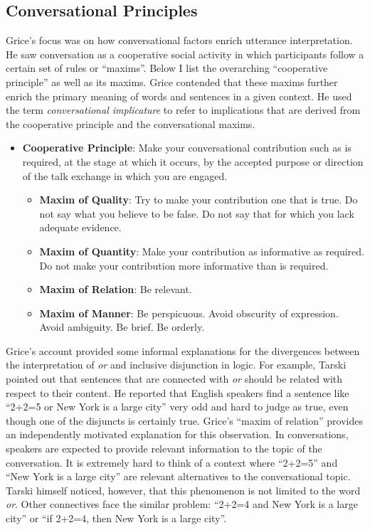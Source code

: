\documentclass[oneside]{report}
\theoremstyle{definition}
\theoremstyle{definition}
\theoremstyle{definition}
\theoremstyle{remark}
\begin{document}
\subsection{Conversational Principles}\label{conversational-principles}

Grice's focus was on how conversational factors enrich utterance
interpretation. He saw conversation as a cooperative social activity in
which participants follow a certain set of rules or ``maxims''. Below I
list the overarching ``cooperative principle'' as well as its maxims.
Grice contended that these maxims further enrich the primary meaning of
words and sentences in a given context. He used the term
\emph{conversational implicature} to refer to implications that are
derived from the cooperative principle and the conversational maxims.
\begin{itemize}
\tightlist
\item
  \textbf{Cooperative Principle}: Make your conversational contribution
  such as is required, at the stage at which it occurs, by the accepted
  purpose or direction of the talk exchange in which you are engaged.
  \begin{itemize}
  \tightlist
  \item
    \textbf{Maxim of Quality}: Try to make your contribution one that is
    true. Do not say what you believe to be false. Do not say that for
    which you lack adequate evidence.
  \item
    \textbf{Maxim of Quantity}: Make your contribution as informative as
    required. Do not make your contribution more informative than is
    required.
  \item
    \textbf{Maxim of Relation}: Be relevant.
  \item
    \textbf{Maxim of Manner}: Be perspicuous. Avoid obscurity of
    expression. Avoid ambiguity. Be brief. Be orderly.
  \end{itemize}
\end{itemize}
Grice's account provided some informal explanations for the divergences
between the interpretation of \emph{or} and inclusive disjunction in
logic. For example, Tarski pointed out that sentences that are connected
with \emph{or} should be related with respect to their content. He
reported that English speakers find a sentence like ``2+2=5 or New York
is a large city'' very odd and hard to judge as true, even though one of
the disjuncts is certainly true. Grice's ``maxim of relation'' provides
an independently motivated explanation for this observation. In
conversations, speakers are expected to provide relevant information to
the topic of the conversation. It is extremely hard to think of a
context where ``2+2=5'' and ``New York is a large city'' are relevant
alternatives to the conversational topic. Tarski himself noticed,
however, that this phenomenon is not limited to the word \emph{or}.
Other connectives face the similar problem: ``2+2=4 and New York is a
large city'' or ``if 2+2=4, then New York is a large city''.
\end{document}

